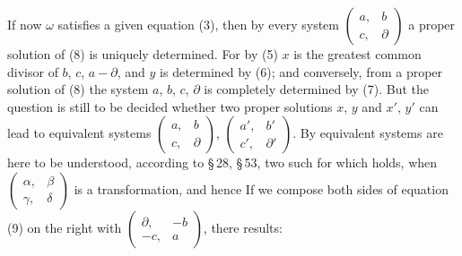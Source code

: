 If now $\omega$ satisfies a given equation (3), then by every system
$\begin{pmatrix} a, & b\\ c, & \partial \end{pmatrix}$ a proper
solution of (8) is uniquely determined. For by (5) $x$ is the greatest
common divisor of $b$, $c$, $a-\partial$, and $y$ is determined by
(6); and conversely, from a proper solution of (8) the system $a$,
$b$, $c$, $\partial$ is completely determined by (7). But the question
is still to be decided whether two  proper solutions $x$, $y$
and $x'$, $y'$ can lead to equivalent systems
$\begin{pmatrix} a, & b\\ c, & \partial \end{pmatrix}$,
$\begin{pmatrix} a', & b'\\ c', & \partial'
\end{pmatrix}$. By equivalent systems are here to be understood,
according to \S\,28, \S\,53, two such for which
holds, when $\begin{pmatrix} \alpha, & \beta\\ \gamma, & \delta
\end{pmatrix}$ is a  transformation, and hence
If we compose both sides of equation (9) on the right with
$\begin{pmatrix} \partial, & -b\\ -c, & a \end{pmatrix}$, there
results:
